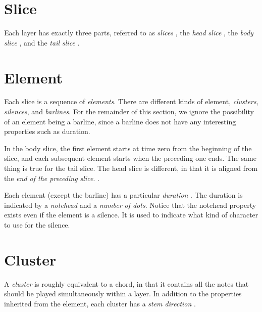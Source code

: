 \section{Slice}

Each layer has exactly three parts, referred to as \emph{slices}
, the \emph{head slice}
, the \emph{body slice}
, and the \emph{tail slice}
. 

\section{Element}

Each slice is a sequence of \emph{elements}.  There are
different kinds of element, \emph{clusters},
\emph{silences}, and \emph{barlines}.
For the remainder of this section, we ignore the possibility of
an element being a barline, since a barline does not have any
interesting properties such as duration.

In the body slice, the first element starts at time zero from the
beginning of the slice, and each subsequent element starts when the
preceding one ends.  The same thing is true for the tail
slice.  The head slice is
different, in that it is aligned from the \emph{end of the preceding
slice}.  .

Each element (except the barline) has a particular \emph{duration}
.  The duration is indicated by a \emph{notehead}
 and a \emph{number of dots}. 
 Notice that the notehead property exists even
if the element is a silence.  It is used to indicate what kind of
character to use for the silence.


\section{Cluster}

A \emph{cluster} is roughly equivalent to a chord, in
that it contains all the notes that should be played simultaneously
within a layer.  In addition to the properties inherited from the
element, each cluster has a \emph{stem direction}  .

